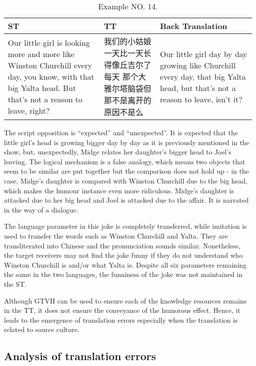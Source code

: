 \documentclass[english]{textolivre}
\begin{document}
\begin{table}[htpb]
\caption{Example NO. 14.}
\label{tbl14}
\begin{tabularx}{\linewidth}{XXX}
\toprule 
ST  & TT & Back Translation \\ 
\midrule
Our little girl is looking more and 	more like Winston Churchill every day, you know, with that big Yalta head. 
But that's not a reason to leave, right?  & 我们的小姑娘一天比一天长得像丘吉尔了每天 那个大雅尔塔脑袋但那不是离开的原因不是么 & Our little girl day by day growing like Churchill every day, that big Yalta head, but that's not a reason to leave, isn't it? \\ 
\bottomrule
\end{tabularx}
\end{table}

The script opposition is “expected” and “unexpected”. It is expected that the little girl's head is growing bigger day by day as it is previously mentioned in the show, but, unexpectedly, Midge relates her daughter's bigger head to Joel's leaving. The logical mechanism is a false analogy, which means two objects that seem to be similar are put together but the comparison does not hold up - in the case, Midge's daughter is compared with Winston Churchill due to the big head, which makes the humour instance even more ridiculous. Midge's daughter is attacked due to her big head and Joel is attacked due to the affair. It is narrated in the way of a dialogue. 

The language parameter in this joke is completely transferred, while imitation is used to transfer the words such as Winston Churchill and Yalta. They are transliterated into Chinese and the pronunciation sounds similar. Nonetheless, the target receivers may not find the joke funny if they do not understand who Winston Churchill is and/or what Yalta is. Despite all six parameters remaining the same in the two languages, the funniness of the joke was not maintained in the ST.  

Although GTVH can be used to ensure each of the knowledge resources remains in the TT, it does not ensure the conveyance of the humorous effect. Hence, it leads to the emergence of translation errors especially when the translation is related to source culture. 

\subsection{Analysis of translation errors}
\end{document}
